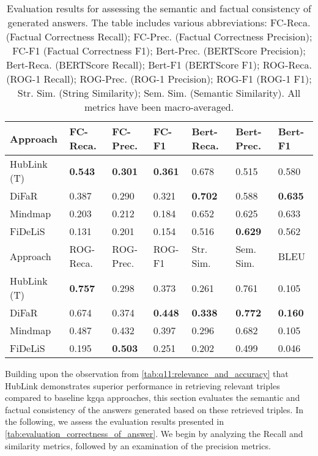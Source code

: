 \begin{table}[t]
\centering
\begin{tabular}{@{}lllllll}
\toprule
Approach & FC-Reca. & FC-Prec. & FC-F1 & Bert-Reca. & Bert-Prec. & Bert-F1 \\ 
\midrule
HubLink (T) & \textbf{0.543} & \textbf{0.301} & \textbf{0.361} & 0.678 & 0.515 & 0.580 \\ 
DiFaR & 0.387 & 0.290 & 0.321 & \textbf{0.702} & 0.588 & \textbf{0.635} \\ 
Mindmap & 0.203 & 0.212 & 0.184 & 0.652 & 0.625 & 0.633 \\ 
FiDeLiS & 0.131 & 0.201 & 0.154 & 0.516 & \textbf{0.629} & 0.562 \\ 
\toprule
Approach & ROG-Reca. & ROG-Prec. & ROG-F1 & Str. Sim. & Sem. Sim. & BLEU \\ 
\midrule
HubLink (T) & \textbf{0.757} & 0.298 & 0.373 & 0.261 & 0.761 & 0.105 \\ 
DiFaR & 0.674 & 0.374 & \textbf{0.448} & \textbf{0.338} & \textbf{0.772} & \textbf{0.160} \\ 
Mindmap & 0.487 & 0.432 & 0.397 & 0.296 & 0.682 & 0.105 \\ 
FiDeLiS & 0.195 & \textbf{0.503} & 0.251 & 0.202 & 0.499 & 0.046 \\ 
\bottomrule
\end{tabular}%
\caption[Results for Semantical and Factual Answer Consistency]{Evaluation results for assessing the semantic and factual consistency of generated answers. The table includes various abbreviations: FC-Reca. (Factual Correctness Recall); FC-Prec. (Factual Correctness Precision); FC-F1 (Factual Correctness F1); Bert-Prec. (BERTScore Precision); Bert-Reca. (BERTScore Recall); Bert-F1 (BERTScore F1); ROG-Reca. (ROG-1 Recall); ROG-Prec. (ROG-1 Precision); ROG-F1 (ROG-1 F1); Str. Sim. (String Similarity); Sem. Sim. (Semantic Similarity). All metrics have been macro-averaged.}
\label{tab:evaluation_correctness_of_answer}
\end{table}

Building upon the observation from \autoref{tab:q11:relevance_and_accuracy} that HubLink demonstrates superior performance in retrieving relevant triples compared to baseline \gls{kgqa} approaches, this section evaluates the semantic and factual consistency of the answers generated based on these retrieved triples. In the following, we assess the evaluation results presented in \autoref{tab:evaluation_correctness_of_answer}. We begin by analyzing the Recall and similarity metrics, followed by an examination of the precision metrics. 

